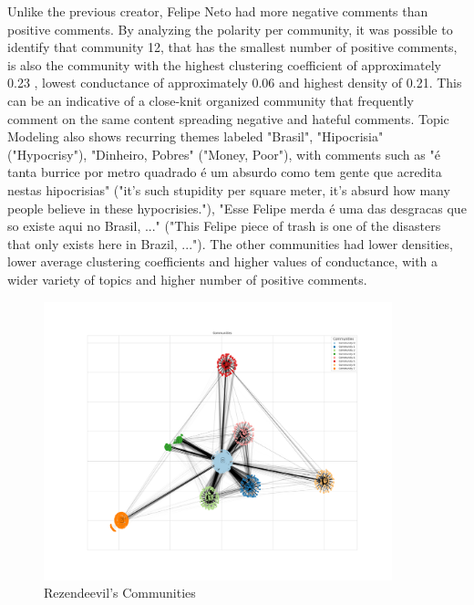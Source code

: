 \documentclass[12pt]{article}
\begin{document}
Unlike the previous creator, Felipe Neto had more negative comments than positive comments. 
By analyzing the polarity per community, it was possible to identify that community 12, 
that has the smallest number of positive comments, is also the community with the highest clustering 
coefficient of approximately 0.23 , lowest conductance of approximately 0.06 and highest density 
of 0.21. This can be an indicative of a close-knit organized community that frequently comment on the 
same content spreading negative and hateful comments. 
Topic Modeling also shows recurring themes labeled "Brasil", "Hipocrisia" 
("Hypocrisy"), "Dinheiro, Pobres" ("Money, Poor"), with comments such as 
"é tanta burrice por metro quadrado é um absurdo como tem gente que acredita nestas hipocrisias" 
("it's such stupidity per square meter, it's absurd how many people believe in these hypocrisies."),
"Esse Felipe merda é uma das desgracas que so existe aqui no Brasil, ..." 
("This Felipe piece of trash is one of the disasters that only exists here in Brazil, ..."). 
The other communities had lower densities, lower average clustering coefficients and higher values 
of conductance, with a wider variety of topics and higher number of positive comments. 


\begin{figure}[t!]
    \centering
    \includegraphics[keepaspectratio,width=0.9\textwidth]{./imgs/rezendeevil/communities.png}
    \caption[width=\textwidth]{Rezendeevil's Communities}
    \label{fig:rezendeevil_comm}
\end{figure}
\end{document}
